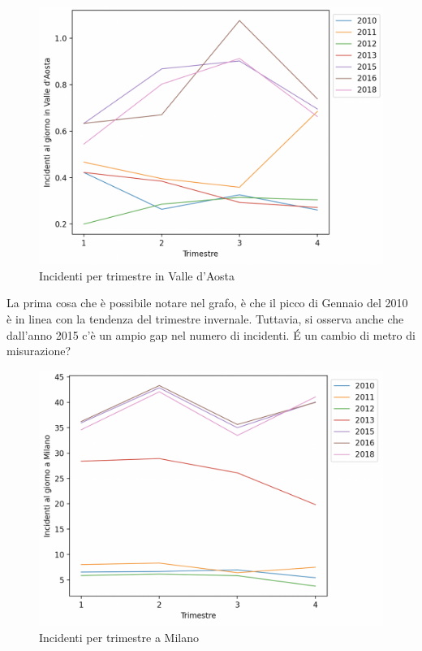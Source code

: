 \documentclass[a4paper]{report}
\begin{document}
\begin{figure}
    \includegraphics[width=\linewidth]{../src/incidenti/incidenti_senza_coords/mese_incidenti/aosta_timestre.png}
    \caption{Incidenti per trimestre in Valle d'Aosta}
    \label{fig:aosta-trimestre}
\end{figure}

La prima cosa che è possibile notare nel grafo, è che il picco di Gennaio del 2010 è 
in linea con la tendenza del trimestre invernale. 
Tuttavia, si osserva anche che dall'anno 2015 c'è un ampio gap nel numero di 
incidenti. 
\'E un cambio di metro di misurazione? 

\begin{figure}
    \includegraphics[width=\linewidth]{../src/incidenti/incidenti_senza_coords/mese_incidenti/milano_trimestre.png}
    \caption{Incidenti per trimestre a Milano}
    \label{fig:milano-trimestre}
\end{figure}
\end{document}
